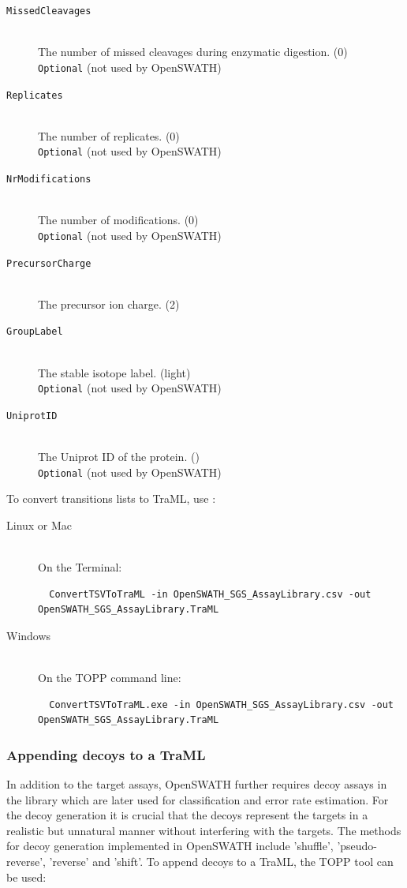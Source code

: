 \begin{description}
  \item[\texttt{MissedCleavages}] \hfill \\
  The number of missed cleavages during enzymatic digestion. (0)\\
  \texttt{Optional} (not used by OpenSWATH)
  \item[\texttt{Replicates}] \hfill \\
  The number of replicates. (0)\\
  \texttt{Optional} (not used by OpenSWATH)
  \item[\texttt{NrModifications}] \hfill \\
  The number of modifications. (0)\\
  \texttt{Optional} (not used by OpenSWATH)
  \item[\texttt{PrecursorCharge}] \hfill \\
  The precursor ion charge. (2)
  \item[\texttt{GroupLabel}] \hfill \\
  The stable isotope label. (light)\\
  \texttt{Optional} (not used by OpenSWATH)
  \item[\texttt{UniprotID}] \hfill \\
  The Uniprot ID of the protein. ()\\
  \texttt{Optional} (not used by OpenSWATH)
\end{description}

To convert transitions lists to TraML, use :\\

\begin{description}
  \item[Linux or Mac] \hfill \\
    On the Terminal:
    \begin{lstlisting}
  ConvertTSVToTraML -in OpenSWATH_SGS_AssayLibrary.csv -out OpenSWATH_SGS_AssayLibrary.TraML
  \end{lstlisting}
  \item[Windows] \hfill \\
    On the TOPP command line:
    \begin{lstlisting}
  ConvertTSVToTraML.exe -in OpenSWATH_SGS_AssayLibrary.csv -out OpenSWATH_SGS_AssayLibrary.TraML
  \end{lstlisting}
\end{description}

\subsubsection{Appending decoys to a TraML}
In addition to the target assays, OpenSWATH further requires decoy assays in the library which are later used for classification and error rate estimation. For the decoy generation it is crucial that the decoys represent the targets in a realistic but unnatural manner without interfering with the targets. The methods for decoy generation implemented in OpenSWATH include 'shuffle', 'pseudo-reverse', 'reverse' and 'shift'. To append decoys to a TraML, the TOPP tool  can be used:

